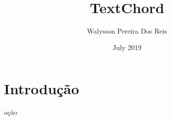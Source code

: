 \documentclass{article}
\title{TextChord}
\author{Walysson Pereira Dos Reis}
\date{July 2019}
\begin{document}
\maketitle

\section{Introdução}
ação
\end{document}

